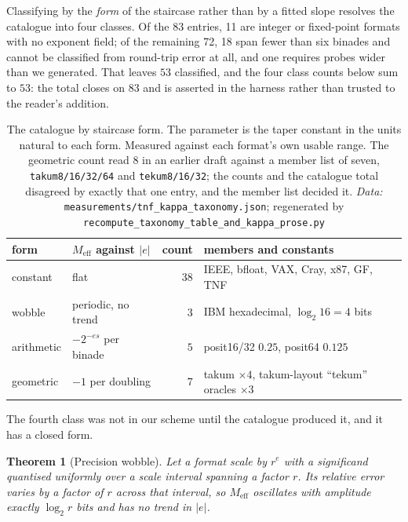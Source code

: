\documentclass[11pt]{article}
\newtheorem{theorem}{Theorem}
\theoremstyle{definition}
\begin{document}
Classifying by the \emph{form} of the staircase rather than by a fitted slope
resolves the catalogue into four classes. Of the 83 entries, 11 are integer or
fixed-point formats with no exponent field; of the remaining 72, 18 span fewer
than six binades and cannot be classified from round-trip error at all, and one
requires probes wider than we generated. That leaves $53$ classified, and the
four class counts below sum to $53$: the total closes on $83$ and is asserted in
the harness rather than trusted to the reader's addition.

\begin{table}[t]\centering
\caption{The catalogue by staircase form. The parameter is the taper constant in
the units natural to each form. Measured against each format's own usable range.
The geometric count read $8$ in an earlier draft against a member list of seven,
\texttt{takum8/16/32/64} and \texttt{tekum8/16/32}; the counts and the catalogue
total disagreed by exactly that one entry, and the member list decided it. \emph{Data:} \texttt{measurements/tnf\_kappa\_taxonomy.json}; regenerated by \texttt{recompute\_taxonomy\_table\_and\_kappa\_prose.py}}
\label{tab:taxonomy}
\begin{tabular}{llrl}
\toprule
form & $M_{\mathrm{eff}}$ against $|e|$ & count & members and constants \\
\midrule
constant   & flat                          & $38$ & IEEE, bfloat, VAX, Cray, x87, GF, TNF \\
wobble     & periodic, no trend            & $3$  & IBM hexadecimal, $\log_2 16 = 4$ bits \\
arithmetic & $-2^{-es}$ per binade         & $5$  & posit16/32 $0.25$, posit64 $0.125$ \\
geometric  & $-1$ per doubling             & $7$  & takum $\times 4$, takum-layout ``tekum'' oracles $\times 3$ \\
\bottomrule
\end{tabular}
\end{table}

The fourth class was not in our scheme until the catalogue produced it, and it has
a closed form.

\begin{theorem}[Precision wobble]
\label{thm:wobble}
Let a format scale by $r^{e}$ with a significand quantised uniformly over a
scale interval spanning a factor $r$. Its relative error varies by a factor of
$r$ across that interval, so $M_{\mathrm{eff}}$ oscillates with amplitude exactly
$\log_2 r$ bits and has no trend in $|e|$.
\end{theorem}
\end{document}
